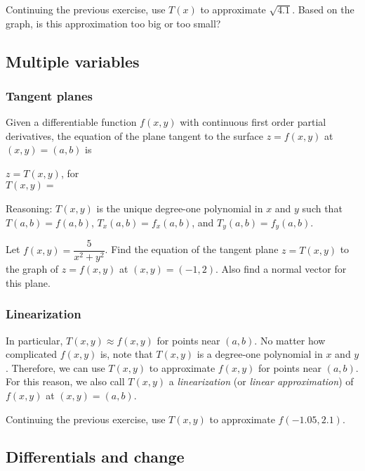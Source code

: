 \begin{ex}
    Continuing the previous exercise, use $T(x)$ to approximate $\sqrt{4.1}$. Based on the graph, is this approximation too big or too small?
\end{ex}

\vfill

\pagebreak 

\subsection{Multiple variables}
\subsubsection{Tangent planes}
Given a differentiable function $f(x,y)$ with continuous first order partial derivatives, the equation of the plane tangent to the surface $z=f(x,y)$ at $(x,y)=(a,b)$ is 
\bigskip 

\noindent $z=T(x,y)$, for  $T(x,y)=\phantom{f(a,b)+f_x(a,b)\cdot (x-a)+f_y(a,b)\cdot (y-b).}$
\vfill

\noindent Reasoning: $T(x,y)$ is the unique degree-one polynomial in $x$ and $y$ such that $T(a,b)=f(a,b)$, $T_x(a,b)=f_x(a,b)$, and $T_y(a,b)=f_y(a,b)$.
\begin{ex}
    Let $f(x,y)=\dfrac{5}{x^2+y^2}$. Find the equation of the tangent plane $z=T(x,y)$ to the graph of $z=f(x,y)$ at $(x,y)=(-1,2)$. Also find a normal vector for this plane.
\end{ex}

\vspace{2.5in}

\subsubsection{Linearization}
In particular, $T(x,y)\approx f(x,y)$ for points near $(a,b)$. No matter how complicated $f(x,y)$ is, note that $T(x,y)$ is a degree-one polynomial in $x$ and $y$. Therefore, we can use $T(x,y)$ to approximate $f(x,y)$ for points near $(a,b)$. For this reason, we also call $T(x,y)$ a \emph{linearization} (or \emph{linear approximation}) of $f(x,y)$ at $(x,y)=(a,b)$.
\begin{ex}
    Continuing the previous exercise, use $T(x,y)$ to approximate $f(-1.05,2.1)$.
\end{ex}

\vfill 

\pagebreak

\subsection{Differentials and change}
